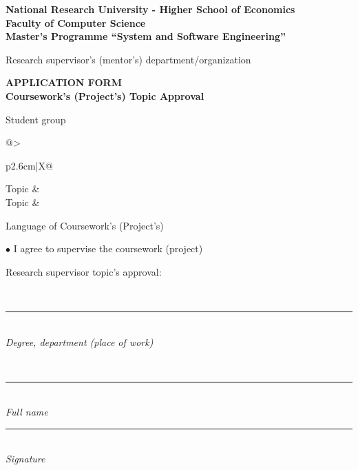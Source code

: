 \documentclass[12pt,a4paper]{article}
\newcommand{\hseSignField}[2]{%
  \begin{minipage}[t]{#1}\centering
    \rule{\linewidth}{0.4pt}\\[-2pt]{\footnotesize\itshape #2}
  \end{minipage}}
\newcommand{\hseFilledField}[3]{%
  \begin{minipage}[t]{#1}\centering
    {\small\strut #2}\\[-4pt]\rule{\linewidth}{0.4pt}\\[-2pt]{\footnotesize\itshape #3}
  \end{minipage}}
\begin{document}
\ifhseLangEn
\begin{center}
\textbf{National Research University - Higher School of Economics}\\[4pt]
\textbf{Faculty of Computer Science}\\[4pt]
\textbf{Master’s Programme “System and Software Engineering”}
\end{center}

\vspace{0.6cm}
\begin{minipage}[t]{0.5\textwidth}\raggedright
\small Research supervisor's (mentor's) department/organization\\
\foreignlanguage{russian}{\hseSupervisorDepartment}
\end{minipage}

\vspace{0.6cm}
\begin{center}
\textbf{APPLICATION FORM}\\
\textbf{Coursework's (Project's) Topic Approval}
\end{center}

\vspace{0.4cm}
Student \underline{} group \underline{}

\vspace{0.6cm}
\renewcommand{\arraystretch}{1.3}
\begin{tabularx}{\textwidth}{@{}>{\raggedright\arraybackslash}p{2.6cm}|X@{}}
Topic & \foreignlanguage{russian}{\hseTitleRu} \\[0.6cm]
Topic & \hseTitleEn \\
\end{tabularx}

\vspace{0.6cm}
Language of Coursework’s (Project’s)\underline{\makebox[4cm][l]{\ \hseWorkLangEn}}

\vspace{0.5cm}
$\bullet$ I agree to supervise the coursework (project)

\vspace{0.3cm}
\begin{minipage}[t]{0.27\textwidth}\raggedright Research supervisor topic's approval:\end{minipage}%
\hseFilledField{0.3\textwidth}{\foreignlanguage{russian}{\hseSupervisorTitle\ifdefempty{\hseSupervisorDegree}{}{, \hseSupervisorDegree}}}{Degree, department (place of work)}\hfill
\hseFilledField{0.22\textwidth}{\foreignlanguage{russian}{\hseSupervisorShortName}}{Full name}\hfill
\hseSignField{0.15\textwidth}{Signature}
\end{document}
